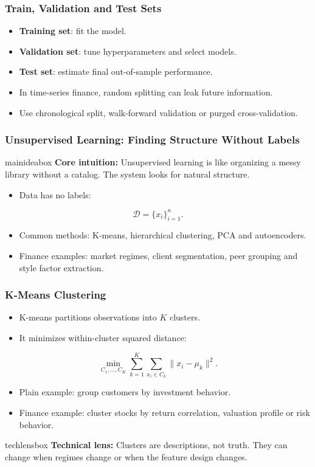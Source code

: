 \documentclass[aspectratio=169,12pt]{beamer}
\newcommand{\currentframetitle}{}
\newcommand{\slideTitle}[1]{\gdef\currentframetitle{#1}\frametitle{#1}}
\newcommand{\keyterm}[1]{\textbf{#1}}
\newcommand{\mainidea}[1]{%
  \vspace{0.08cm}
  \begin{beamercolorbox}[wd=\linewidth,rounded=true,sep=0.18cm]{mainideabox}
    \small\textbf{Core intuition:} #1
  \end{beamercolorbox}%
}
\newcommand{\techlens}[1]{%
  \vspace{0.08cm}
  \begin{beamercolorbox}[wd=\linewidth,rounded=true,sep=0.18cm]{techlensbox}
    \small\textbf{Technical lens:} #1
  \end{beamercolorbox}%
}
\begin{document}
\begin{frame}
\slideTitle{Train, Validation and Test Sets}
\begin{itemize}
  \item \keyterm{Training set}: fit the model.
  \item \keyterm{Validation set}: tune hyperparameters and select models.
  \item \keyterm{Test set}: estimate final out-of-sample performance.
  \item In time-series finance, random splitting can leak future information.
  \item Use chronological split, walk-forward validation or purged cross-validation.
\end{itemize}
\end{frame}




\begin{frame}
\slideTitle{Unsupervised Learning: Finding Structure Without Labels}
\mainidea{Unsupervised learning is like organizing a messy library without a catalog. The system looks for natural structure.}
\begin{itemize}
  \item Data has no labels:
\end{itemize}
\[
\mathcal{D}=\{x_i\}_{i=1}^{n}.
\]
\begin{itemize}
  \item Common methods: K-means, hierarchical clustering, PCA and autoencoders.
  \item Finance examples: market regimes, client segmentation, peer grouping and style factor extraction.
\end{itemize}
\end{frame}

\begin{frame}
\slideTitle{K-Means Clustering}
\begin{itemize}
  \item K-means partitions observations into $K$ clusters.
  \item It minimizes within-cluster squared distance:
\end{itemize}
\[
\min_{C_1,\ldots,C_K}\sum_{k=1}^K \sum_{x_i\in C_k} \|x_i-\mu_k\|^2.
\]
\begin{itemize}
  \item Plain example: group customers by investment behavior.
  \item Finance example: cluster stocks by return correlation, valuation profile or risk behavior.
\end{itemize}
\techlens{Clusters are descriptions, not truth. They can change when regimes change or when the feature design changes.}
\end{frame}
\end{document}
